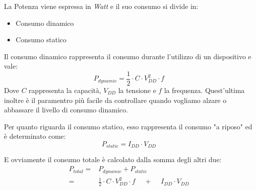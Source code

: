 \documentclass[../main.tex]{subfiles}
\begin{document}
La Potenza viene espressa in \textit{Watt} e il suo consumo si divide in:
\begin{itemize}
    \item Consumo dinamico
    \item Consumo statico
\end{itemize}

Il consumo dinamico rappresenta il consumo durante l'utilizzo di un dispositivo e vale:
$$
    P_{dynamic} = \frac{1}{2} \cdot C \cdot V_{DD}^2 \cdot f
$$
Dove $C$ rappresenta la capacità, $V_{DD}$ la tensione e $f$ la frequenza. Quest'ultima inoltre
è il paramentro più facile da controllare quando vogliamo alzare o abbassare il livello di consumo dinamico.

Per quanto riguarda il consumo statico, esso rappresenta il consumo "a riposo" ed è determinato come:
$$
    P_{static} = I_{DD} \cdot V_{DD}
$$

E ovviamente il consumo totale è calcolato dalla somma degli altri due:
\begin{align*}
    P_{total} =& P_{dynamic} + P_{static} \\
    =&\frac{1}{2} \cdot C \cdot V_{DD}^2 \cdot f \phantom{-} + \phantom{-} I_{DD} \cdot V_{DD}
\end{align*}
    
\end{document}
